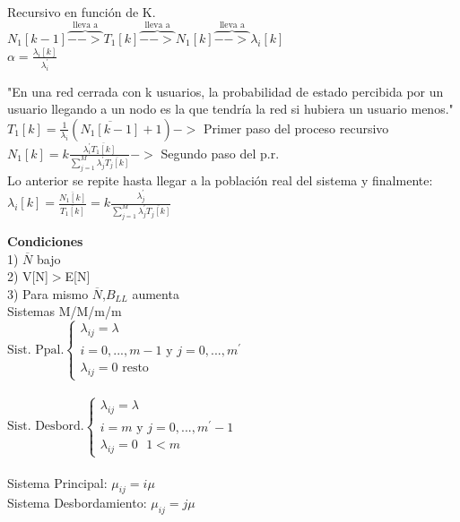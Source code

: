 \begin{minipage}{.22\textwidth}
	Recursivo en función de K.\\
	$N_1[k-1]\overbrace{-->}^{\text{lleva a}}T_ 1[k]\overbrace{-->}^{\text{lleva a}}N_1[k]\overbrace{-->}^{\text{lleva a}}\lambda_i[k]$ \\
	$\alpha=\frac{\lambda_i[k]}{\lambda_i^{'}}$ \\
\end{minipage}

\begin{minipage}{.22\textwidth}
	"En una red cerrada con k usuarios, la probabilidad de estado percibida por un usuario llegando a un nodo es la que tendría la red si hubiera un usuario menos." \\
	$T_1[k]=\frac{1}{\lambda_i}(\overline{N_1[k-1]} + 1) ->$ Primer paso del proceso recursivo \\
	$N_1[k]=k\frac{\lambda_i^{'}{\overline{T_1[k]}}}{\sum_{j=1}^{M}{\lambda_j^{'}{\overline{T_j[k]}}}} ->$ Segundo paso del p.r. \\
	Lo anterior se repite hasta llegar a la población real del sistema y finalmente: \\
	$\lambda_i[k]=\frac{\overline{N_1[k]}}{\overline{T_1[k]}} = k\frac{\lambda_j^{'}}{\sum_{j=1}^{M}{\lambda_j^{'}{\overline{T_j[k]}}}}$ \\
\end{minipage}

\begin{minipage}{.22\textwidth}
	{\bf Condiciones} \\
	1) $\overline{N}$ bajo \\
	2) V[N]$>$E[N] \\
	3) Para mismo $\overline{N}$,$B_{LL}$ aumenta \\
	Sistemas M/M/m/m \\
	$\text{Sist. Ppal.}\left \{  \begin{matrix} \lambda_{ij}=\lambda               \\
			i=0,...,m-1\text{ y }j=0,...,m^{'} \\
			\lambda_{ij}=0 \text{  resto}\end{matrix}  \right .$ \\ \\
	$\text{Sist. Desbord.}\left \{  \begin{matrix} \lambda_{ij}=\lambda         \\
			i=m\text{ y }j=0,...,m^{'}-1 \\
			\lambda_{ij}=0 \text{  }1<m\end{matrix}  \right .$ \\ \\
	Sistema Principal: $\mu_{ij}=i\mu$ \\
	Sistema Desbordamiento: $\mu_{ij}=j\mu$ \\
\end{minipage}

